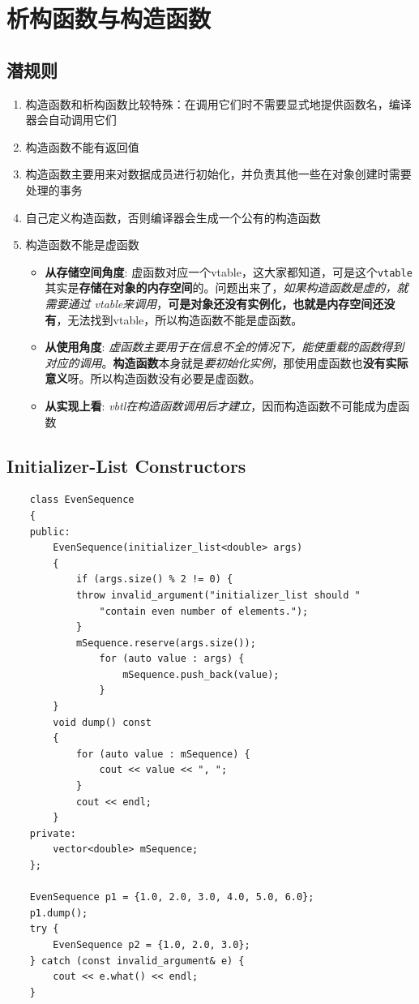 \documentclass[UTF8,a4paper,12pt]{ctexbook} %
\begin{document}
\section{析构函数与构造函数}
		\subsection{潜规则}
		    \begin{enumerate}[fullwidth,itemindent=2em,label=(\arabic*)]
		       \item  构造函数和析构函数比较特殊：在调用它们时不需要显式地提供函数名，编译器会自动调用它们
		       
		       \item  构造函数不能有返回值
		       
		       \item  构造函数主要用来对数据成员进行初始化，并负责其他一些在对象创建时需要处理的事务
		       
		       \item  自己定义构造函数，否则编译器会生成一个公有的构造函数
		       
		       \item  构造函数不能是虚函数
			      \begin{itemize}[itemindent  = 2em]
			      	\item \textbf{从存储空间角度}:
				      	虚函数对应一个vtable，这大家都知道，可是这个\verb|vtable|其实是\textbf{存储在对象的内存空间}的。问题出来了，\textit{如果构造函数是虚的，就需要通过 vtable来调用}，\textbf{可是对象还没有实例化，也就是内存空间还没有}，无法找到vtable，所以构造函数不能是虚函数。
				      	
			      	\item \textbf{从使用角度}:
				      	\textit{虚函数主要用于在信息不全的情况下，能使重载的函数得到对应的调用}。\textbf{构造函数}本身就是\textit{要初始化实例}，那使用虚函数也\textbf{没有实际意义}呀。所以构造函数没有必要是虚函数。
				      	
			      	\item \textbf{从实现上看}:
				      	\textit{vbtl在构造函数调用后才建立}，因而构造函数不可能成为虚函数
			      \end{itemize}
		    \end{enumerate}
		  \subsection{Initializer-List Constructors}    
			  \begin{lstlisting}
	class EvenSequence
	{
	public:
		EvenSequence(initializer_list<double> args)
		{
			if (args.size() % 2 != 0) {
			throw invalid_argument("initializer_list should "
				"contain even number of elements.");
			}
			mSequence.reserve(args.size());
				for (auto value : args) {
					mSequence.push_back(value);
				}
		}
		void dump() const
		{
			for (auto value : mSequence) {
				cout << value << ", ";
			}
			cout << endl;
		}	
	private:
		vector<double> mSequence;
	};
	
	EvenSequence p1 = {1.0, 2.0, 3.0, 4.0, 5.0, 6.0};
	p1.dump();
	try {
		EvenSequence p2 = {1.0, 2.0, 3.0};
	} catch (const invalid_argument& e) {
		cout << e.what() << endl;
	}
			  \end{lstlisting} 
		
\end{document}
